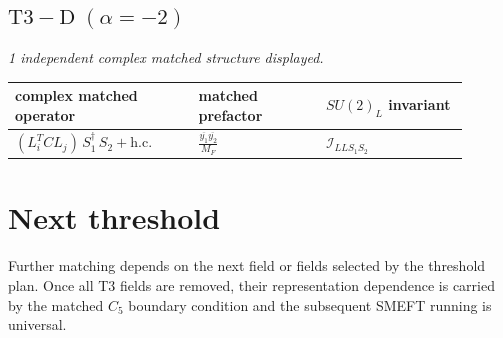 \documentclass[9pt]{article}
\begin{document}
\subsection*{$ \mathrm{T3-D}\;(\alpha=-2) $}
\textit{1 independent complex matched structure displayed. }
\begin{longtable}{@{}p{0.36\linewidth}p{0.25\linewidth}p{0.29\linewidth}@{}}
\toprule
complex matched operator & matched prefactor & $SU(2)_L$ invariant \\
\midrule
$ (L_i^T C L_j)\,S_1^\dagger\,S_2+\mathrm{h.c.} $ & $ \frac{\overline{y_{1}} \overline{y_{2}}}{M_F} $ & $ \mathcal{I}_{LLS_1S_2} $ \\
\bottomrule
\end{longtable}
\section*{Next threshold}
Further matching depends on the next field or fields selected by the threshold plan.  Once all T3 fields are removed, their representation dependence is carried by the matched $C_5$ boundary condition and the subsequent SMEFT running is universal.
\end{document}
